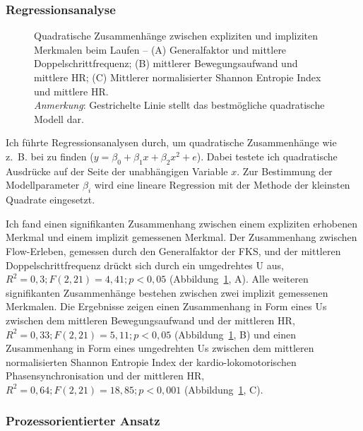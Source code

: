\subsubsection{Regressionsanalyse} 

\label{ssub:regressionsanalyse} 
\begin{figure}
	[!htb]  \caption[Quadratische Zusammenhänge zwischen expliziten und impliziten Merkmalen (Erste Studie: Laufen)]{Quadratische Zusammenhänge zwischen expliziten und impliziten Merkmalen beim Laufen -- (A) Generalfaktor und mittlere Doppelschrittfrequenz; (B) mittlerer Bewegungsaufwand und mittlere \ac{HR}; (C) Mittlerer normalisierter Shannon Entropie Index und mittlere \ac{HR}.\\
	\hspace{ 
	\textwidth}\emph{Anmerkung}: Gestrichelte Linie stellt das bestmögliche quadratische Modell dar.} \label{fig:regressionsanalyse_1} 
\end{figure}

Ich führte Regressionsanalysen durch, um quadratische Zusammenhänge wie z.~B. bei \citet{Peifer2014} zu finden ($y=\beta_{0}+\beta_{1}x+\beta_{2}x^{2}+e$). Dabei testete ich quadratische Ausdrücke auf der Seite der unabhängigen Variable $x$. Zur Bestimmung der Modellparameter $\beta_i$ wird eine lineare Regression mit der Methode der kleinsten Quadrate eingesetzt. 

Ich fand einen signifikanten Zusammenhang zwischen einem expliziten erhobenen Merkmal und einem implizit gemessenen Merkmal. Der Zusammenhang zwischen Flow-Erleben, gemessen durch den Generalfaktor der \ac{FKS}, und der mittleren Doppelschrittfrequenz drückt sich durch ein umgedrehtes U aus, $R^2 = 0{,}3; F(2, 21) = 4{,}41; p < 0{,}05$ (Abbildung~\ref{fig:regressionsanalyse_1}, A). Alle weiteren signifikanten Zusammenhänge bestehen zwischen zwei implizit gemessenen Merkmalen. Die Ergebnisse zeigen einen Zusammenhang in Form eines Us zwischen dem mittleren Bewegungsaufwand und der mittleren \ac{HR}, $R^2 = 0{,}33; F(2, 21) = 5{,}11; p < 0{,}05$ (Abbildung~\ref{fig:regressionsanalyse_1}, B) und einen Zusammenhang in Form eines umgedrehten Us zwischen dem mittleren normalisierten Shannon Entropie Index der kardio-lokomotorischen Phasensynchronisation und der mittleren \ac{HR}, $R^2 = 0{,}64; F(2, 21) = 18{,}85; p < 0{,}001$ (Abbildung~\ref{fig:regressionsanalyse_1}, C).

\subsubsection{Prozessorientierter Ansatz} 

